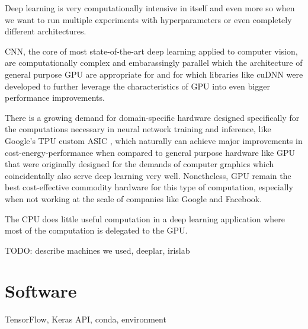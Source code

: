 Deep learning is very computationally intensive in itself and even more so when we want to run multiple experiments with hyperparameters or even completely different architectures.

\ac{CNN}, the core of most state-of-the-art deep learning applied to computer vision, are computationally complex and embarassingly parallel \cite{chang2017} which the architecture of general purpose \ac{GPU} are appropriate for \cite{gpu} and for which libraries like cuDNN \cite{cudnn} were developed to further leverage the characteristics of \ac{GPU} into even bigger performance improvements.

There is a growing demand for domain-specific hardware designed specifically for the computations necessary in neural network training and inference, like Google's TPU custom ASIC \cite{tpu}, which naturally can achieve major improvements in cost-energy-performance when compared to general purpose hardware like \ac{GPU} that were originally designed for the demands of computer graphics which coincidentally also serve deep learning very well. Nonetheless, \ac{GPU} remain the best cost-effective commodity hardware for this type of computation, especially when not working at the scale of companies like Google and Facebook.

The CPU does little useful computation in a deep learning application where most of the computation is delegated to the GPU.

TODO: describe machines we used, deeplar, irislab

\section{Software}

TensorFlow, Keras API, conda, environment
